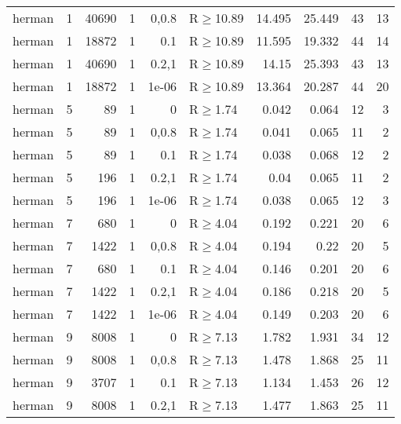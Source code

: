 \begin{longtable}{llrrrlrrrr}
 herman        & 1        &  	40690 &   1 & 0,0.8 & R$\geq$10.89 & 14.495  & 25.449  & 43      & 13   \\
 herman        & 1        &  	18872 &   1 & 0.1   & R$\geq$10.89 & 11.595  & 19.332  & 44      & 14   \\
 herman        & 1        &  	40690 &   1 & 0.2,1 & R$\geq$10.89 & 14.15   & 25.393  & 43      & 13   \\
 herman        & 1        &  	18872 &   1 & 1e-06 & R$\geq$10.89 & 13.364  & 20.287  & 44      & 20   \\
 herman        & 5        &     	89 &   1 & 0     & R$\geq$1.74  & 0.042   & 0.064   & 12      & 3    \\
 herman        & 5        &     	89 &   1 & 0,0.8 & R$\geq$1.74  & 0.041   & 0.065   & 11      & 2    \\
 herman        & 5        &     	89 &   1 & 0.1   & R$\geq$1.74  & 0.038   & 0.068   & 12      & 2    \\
 herman        & 5        &    	196 &   1 & 0.2,1 & R$\geq$1.74  & 0.04    & 0.065   & 11      & 2    \\
 herman        & 5        &    	196 &   1 & 1e-06 & R$\geq$1.74  & 0.038   & 0.065   & 12      & 3    \\
 herman        & 7        &    	680 &   1 & 0     & R$\geq$4.04  & 0.192   & 0.221   & 20      & 6    \\
 herman        & 7        &   	1422 &   1 & 0,0.8 & R$\geq$4.04  & 0.194   & 0.22    & 20      & 5    \\
 herman        & 7        &    	680 &   1 & 0.1   & R$\geq$4.04  & 0.146   & 0.201   & 20      & 6    \\
 herman        & 7        &   	1422 &   1 & 0.2,1 & R$\geq$4.04  & 0.186   & 0.218   & 20      & 5    \\
 herman        & 7        &   	1422 &   1 & 1e-06 & R$\geq$4.04  & 0.149   & 0.203   & 20      & 6    \\
 herman        & 9        &   	8008 &   1 & 0     & R$\geq$7.13  & 1.782   & 1.931   & 34      & 12   \\
 herman        & 9        &   	8008 &   1 & 0,0.8 & R$\geq$7.13  & 1.478   & 1.868   & 25      & 11   \\
 herman        & 9        &   	3707 &   1 & 0.1   & R$\geq$7.13  & 1.134   & 1.453   & 26      & 12   \\
 herman        & 9        &   	8008 &   1 & 0.2,1 & R$\geq$7.13  & 1.477   & 1.863   & 25      & 11   \\

\end{longtable}
